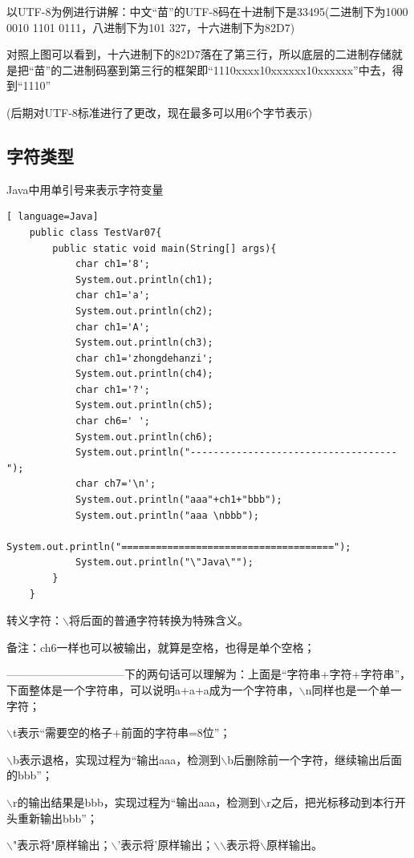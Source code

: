 \documentclass{article}
\begin{document}
	以UTF-8为例进行讲解：中文“苗”的UTF-8码在十进制下是33495(二进制下为1000 0010 1101 0111，八进制下为101 327，十六进制下为82D7)
	
	对照上图可以看到，十六进制下的82D7落在了第三行，所以底层的二进制存储就是把“苗”的二进制码塞到第三行的框架即“1110xxxx\space\space10xxxxxx\space\space10xxxxxx”中去，得到“1110\space{}\space{}”
	
	(后期对UTF-8标准进行了更改，现在最多可以用6个字节表示)
	
	\subsection{字符类型}

	Java中用单引号来表示字符变量
	
	\begin{lstlisting}[ language=Java]
	public class TestVar07{
		public static void main(String[] args){
			char ch1='8';
			System.out.println(ch1);
			char ch1='a';
			System.out.println(ch2);
			char ch1='A';
			System.out.println(ch3);
			char ch1='zhongdehanzi';
			System.out.println(ch4);
			char ch1='?';
			System.out.println(ch5);
			char ch6=' ';
			System.out.println(ch6);
			System.out.println("------------------------------------");
			char ch7='\n';
			System.out.println("aaa"+ch1+"bbb");
			System.out.println("aaa \nbbb");
			System.out.println("=====================================");
			System.out.println("\"Java\"");
		}
	}		
	\end{lstlisting}
	
	转义字符：$\backslash$将后面的普通字符转换为特殊含义。
	
	备注：ch6一样也可以被输出，就算是空格，也得是单个空格；
	
		\setlength{\parindent}{5em}--------------------------------下的两句话可以理解为：上面是“字符串+字符+字符串”，下面整体是一个字符串，可以说明a+a+a成为一个字符串，$\backslash$n同样也是一个单一字符；
		
		$\backslash$t表示“需要空的格子+前面的字符串=8位”；
		
		$\backslash$b表示退格，实现过程为“输出aaa，检测到$\backslash$b后删除前一个字符，继续输出后面的bbb”；
		
		$\backslash$r的输出结果是bbb，实现过程为“输出aaa，检测到$\backslash$r之后，把光标移动到本行开头重新输出bbb”；
		
		$\backslash$"表示将"原样输出；$\backslash$'表示将'原样输出；$\backslash$$\backslash$表示将$\backslash$原样输出。
	
\end{document}
